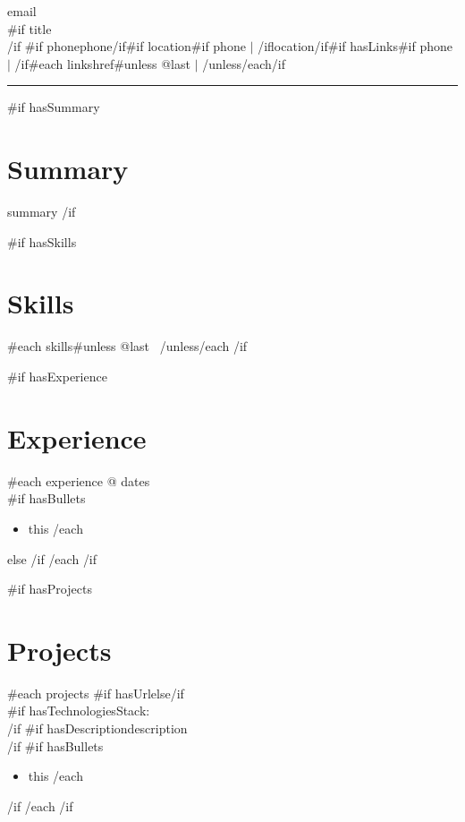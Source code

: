 \documentclass[10.5pt,a4paper]{article}
\begin{document}
{\Large\bfseries {}\relax{}} \hfill {{email}}\\
{{#if title}}\textcolor{accent}{\bfseries {}\relax{}}\\
{{/if}}
{{#if phone}}{{phone}}{{/if}}{{#if location}}{{#if phone}} $\vert$ {{/if}}{{location}}{{/if}}{{#if hasLinks}}{{#if phone}} $\vert$ {{/if}}{{#each links}}{{href}}{{#unless @last}} $\vert$ {{/unless}}{{/each}}{{/if}}

\vspace{6pt}
\hrule
\vspace{2pt}

{{#if hasSummary}}
\section{Summary}
{{summary}}
{{/if}}

{{#if hasSkills}}
\section{Skills}
{{#each skills}}\texttt{\relax{}}{{#unless @last}} \ {{/unless}}{{/each}}
{{/if}}

{{#if hasExperience}}
\section{Experience}
{{#each experience}}
\textbf{\relax{}} @ \textbf{\relax{}} \hfill {{dates}}\\
{{#if hasBullets}}
\begin{itemize}
{{#each bullets}}\item {{this}}
{{/each}}
\end{itemize}
{{else}}
\vspace{4pt}
{{/if}}
{{/each}}
{{/if}}

{{#if hasProjects}}
\section{Projects}
{{#each projects}}
{{#if hasUrl}}\textbf{\relax{}}{{else}}\textbf{\relax{}}{{/if}}\\
{{#if hasTechnologies}}Stack: \texttt{\relax{}}\\
{{/if}}
{{#if hasDescription}}{{description}}\\
{{/if}}
{{#if hasBullets}}
\begin{itemize}
{{#each bullets}}\item {{this}}
{{/each}}
\end{itemize}
{{/if}}
{{/each}}
{{/if}}
\end{document}
